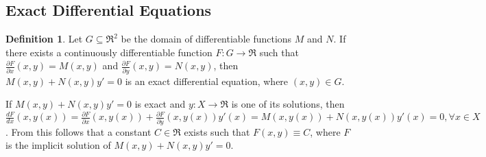 \documentclass[10pt,a4paper]{article}
\theoremstyle{definition}
\newtheorem{defn}{Definition}[section]
\begin{document}
\subsection{Exact Differential Equations}
\begin{defn}
Let $G \subseteq \Re^2$ be the domain of differentiable functions $M$ and $N$.
If there exists a continuously differentiable function $F: G \to \Re$ such that
$\frac{\partial F}{\partial x}(x, y) = M(x, y)$ and $\frac{\partial F}{\partial
y}(x, y) = N(x, y)$, then $M(x,y) + N(x,y) y' = 0$ is an exact differential
equation, where $(x, y) \in G$.
\end{defn}
If $M(x, y) + N(x, y) y' = 0$ is exact and $y: X \to \Re$ is one of its
solutions, then $\frac{dF}{dx}(x, y(x)) = \frac{\partial F}{\partial x}(x,
y(x)) + \frac{\partial F}{\partial y}(x, y(x)) y'(x) = M(x, y(x)) + N(x,
y(x))y'(x) = 0, \forall x \in X$. From this follows that a constant $C \in \Re$
exists such that $F(x, y) \equiv C$, where $F$ is the implicit solution of
$M(x, y) + N(x, y) y' = 0$.
\end{document}
